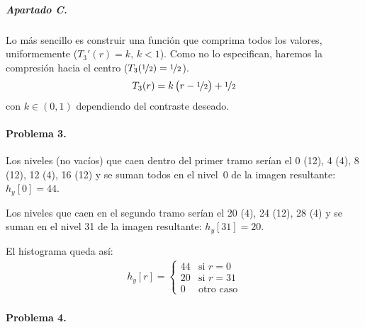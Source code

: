 \subparagraph{Apartado C.}

Lo más sencillo es construir una función que comprima todos los valores,
uniformemente ($T_3'(r) = k, \, k < 1$). Como no lo especifican, haremos la
compresión hacia el centro ($T_3(\nicefrac{1}{2}) = \nicefrac{1}{2}$).
%
\begin{align*}
  T_3(r) = k\left(r - \nicefrac{1}{2}\right) + \nicefrac{1}{2}
\end{align*}
%
con $k \in \left(0, 1\right)$ dependiendo del contraste deseado.

\finishpage
\startpage

\paragraph{Problema 3.}

Los niveles (no vacíos) que caen dentro del primer tramo serían el 0 (12),
4 (4), 8 (12), 12 (4), 16 (12) y se suman todos en el nivel~0 de la imagen
resultante: $h_y[0] = 44$.

Los niveles que caen en el segundo tramo serían el
20 (4), 24 (12), 28 (4) y se suman en el nivel 31 de la imagen resultante:
$h_y[31] = 20$.

El histograma queda así:
%
\begin{align*}
  h_y[r] = \begin{cases}
    44 & \text{si $r = 0$} \\
    20 & \text{si $r = 31$} \\
    0 & \text{otro caso}
  \end{cases}
\end{align*}

\finishpage
\startpage

\paragraph{Problema 4.}

